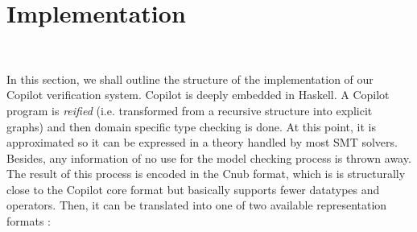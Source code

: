 \section{Implementation}~\label{sec:structure} 

%
%


In this section, we shall outline the structure of the implementation
of our Copilot verification system.   Copilot is deeply embedded in
Haskell.  A Copilot program is \emph{reified} (i.e. transformed from
a recursive structure into explicit graphs) and then domain specific
type checking is done. At this point, it is approximated so it can be expressed in a theory handled by most SMT solvers. Besides, any information of no use for the model checking process is thrown away. The result of this process is encoded in the {Cnub} format, which is is structurally close to the Copilot core format but basically supports fewer datatypes and operators. Then, it can be translated into one of two available representation formats :

